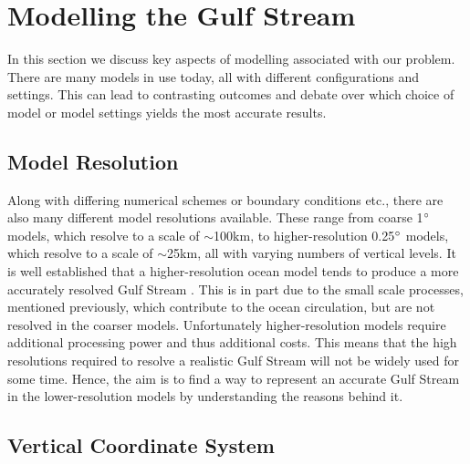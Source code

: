 \documentclass[..\report.tex]{subfiles}
\begin{document}
\section{Modelling the Gulf Stream}
\label{SEC:ModellingGulfStream}

In this section we discuss key aspects of modelling associated with our problem.
There are many models in use today, all with different configurations and settings. This can lead to contrasting outcomes and debate over which choice of model or model settings yields the most accurate results.

\subsection{Model Resolution}
\label{SSEC:ModelResolution}

Along with differing numerical schemes or boundary conditions etc., there are also many different model resolutions available. These range from coarse 1$\degree$ models, which resolve to a scale of $\sim$100km, to higher-resolution 0.25$\degree$ models, which resolve to a scale of $\sim$25km, all with varying numbers of vertical levels. It is well established that a higher-resolution ocean model tends to produce a more accurately resolved Gulf Stream \citep{Scaife2011a,Hurlburt2008}. This is in part due to the small scale processes, mentioned previously, which contribute to the ocean circulation, but are not resolved in the coarser models. Unfortunately higher-resolution models require additional processing power and thus additional costs. This means that the high resolutions required to resolve a realistic Gulf Stream will not be widely used for some time. Hence, the aim is to find a way to represent an accurate Gulf Stream in the lower-resolution models by understanding the reasons behind it.

\subsection{Vertical Coordinate System}
\label{SSEC:VerticalCoordinates}
\end{document}
